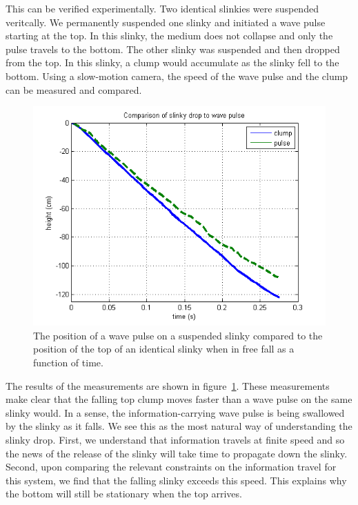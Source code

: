 \documentclass[prb,preprint]{revtex4-1}
\newcommand{\fig}[1]{figure~\ref{fig:#1}}
\begin{document}
This can be verified experimentally. Two identical slinkies were suspended veritcally.
We permanently suspended one slinky and initiated a wave pulse starting at the top.
In this slinky, the medium does not collapse and only the pulse travels to the bottom. The other slinky was suspended and then dropped from the top. In this
slinky, a clump would accumulate as the slinky fell to the bottom. Using a slow-motion camera, the speed of the wave pulse
and the clump can be measured and compared.

\begin{figure}[t!]
\begin{center}
\includegraphics[scale=0.5]{figs/ClumpPulse}
\end{center}
\vspace{-4ex}
\caption{The position of a wave pulse on a suspended slinky compared to the position
of the top of an identical slinky when in free fall as a function of time.}
\label{fig:clumppulse}
\end{figure}

The results of the measurements are shown in \fig{clumppulse}. These measurements
make clear that the falling top clump moves faster than a wave pulse on the same
slinky would. In a sense, the information-carrying wave pulse is being swallowed
by the slinky as it falls. We see this as the most natural way of understanding the
slinky drop. First, we understand that information travels at finite speed and so
the news of the release of the slinky will take time to propagate down the slinky.
Second, upon comparing the relevant constraints on the information travel for this
system, we find that the falling slinky exceeds this speed. This explains why the
bottom will still be stationary when the top arrives.
\end{document}
